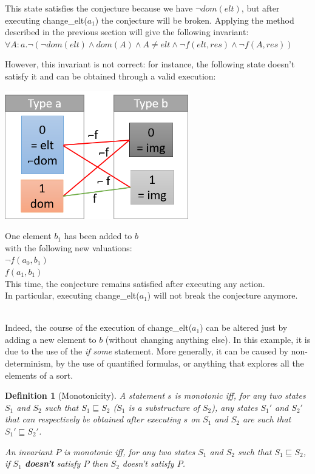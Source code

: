 \documentclass[11pt,a4paper,oldfontcommands,openany]{memoir}
\newtheorem*{definition}{Definition}
\begin{document}
    This state satisfies the conjecture because we have \(\neg dom(elt)\), but after executing change_elt(\(a_1\)) the conjecture will be broken.
    Applying the method described in the previous section will give the following invariant:
    \(\forall A:a. \neg(\neg dom(elt) \land dom(A) \land A \neq elt \land \neg f(elt,res) \land \neg f(A,res))\)

    However, this invariant is not correct: for instance, the following state doesn't satisfy it and can be obtained through a valid execution:

    \begin{minipage}{0.45\textwidth}
        \includegraphics[width=8cm]{NonMonotonicExValid}
    \end{minipage} \hfill
    \begin{minipage}{0.45\textwidth}
        One element \(b_1\) has been added to \(b\)\\
        with the following new valuations:\\
        \(\neg f(a_0,b_1)\)\\
        \(f(a_1,b_1)\)\\
        This time, the conjecture remains satisfied after executing any action.\\
        In particular, executing change_elt(\(a_1\)) will not break the conjecture anymore.
    \end{minipage}\\

    Indeed, the course of the execution of change_elt(\(a_1\)) can be altered just by adding a new element to \(b\)
    (without changing anything else). In this example, it is due to the use of the \textit{if some} statement.
    More generally, it can be caused by non-determinism, by the use of quantified formulas, or anything that explores all the elements of a sort.

    \begin{definition}[Monotonicity]
        A statement \(s\) is monotonic iff, for any two states \(S_1\) and \(S_2\) such that \(S_1 \sqsubseteq S_2\)
        (\(S_1\) is a substructure of \(S_2\)), any states \(S_1'\) and \(S_2'\) that can respectively be obtained after executing
        \(s\) on \(S_1\) and \(S_2\) are such that \(S_1' \sqsubseteq S_2'\).

        An invariant \(P\) is monotonic iff, for any two states \(S_1\) and \(S_2\) such that \(S_1 \sqsubseteq S_2\),
        if \(S_1\) \textbf{doesn't} satisfy \(P\) then \(S_2\) doesn't satisfy \(P\).
    \end{definition}
\end{document}
